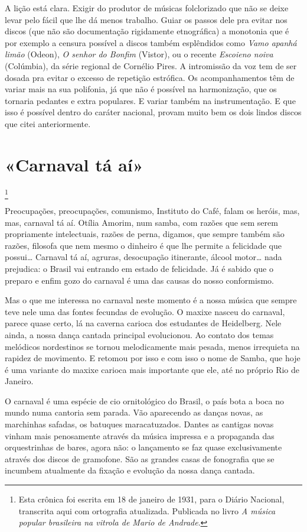 A lição está clara. Exigir do produtor de músicas folclorizado que não
se deixe levar pelo fácil que lhe dá menos trabalho. Guiar os passos
dele pra evitar nos discos (que não são documentação rigidamente
etnográfica) a monotonia que é por exemplo a censura possível a discos
também esplêndidos como \textit{Vamo apanhá limão} (Odeon), \textit{O senhor
do Bonfim} (Vistor), ou o recente \textit{Escoieno noiva} (Colúmbia), da
série regional de Cornélio Pires. A intromissão da voz tem de ser dosada
pra evitar o excesso de repetição estrófica. Os acompanhamentos têm de
variar mais na sua polifonia, já que não é possível na harmonização, que
os tornaria pedantes e extra populares. E variar também na
instrumentação. E que isso é possível dentro do caráter nacional, provam
muito bem os dois lindos discos que citei anteriormente.


\chapter{«Carnaval tá aí»}\footnote{Esta crônica foi escrita em 18 de janeiro de 1931, para o Diário Nacional, transcrita aqui com ortografia atualizada. Publicada no livro \textit{A música popular brasileira na vitrola de Mario de Andrade}.}

Preocupações, preocupações, comunismo, Instituto do Café, falam os
heróis, mas, mas, carnaval tá aí. Otília Amorim, num samba, com razões
que sem serem propriamente intelectuais, razões de perna, digamos, que
sempre também são razões, filosofa que nem mesmo o dinheiro é que lhe
permite a felicidade que possui\ldots{} Carnaval tá aí, agruras, desocupação
itinerante, álcool motor\ldots{} nada prejudica: o Brasil vai entrando em
estado de felicidade. Já é sabido que o preparo e enfim gozo do carnaval
é uma das causas do nosso conformismo.

Mas o que me interessa no carnaval neste momento é a nossa música que
sempre teve nele uma das fontes fecundas de evolução. O maxixe nasceu do
carnaval, parece quase certo, lá na caverna carioca dos estudantes de
Heidelberg. Nele ainda, a nossa dança cantada principal evolucionou. Ao
contato dos temas melódicos nordestinos se tornou melodicamente mais
pesada, menos irrequieta na rapidez de movimento. E retomou por isso e
com isso o nome de Samba, que hoje é uma variante do maxixe carioca mais
importante que ele, até no próprio Rio de Janeiro.

O carnaval é uma espécie de cio ornitológico do Brasil, o país bota a
boca no mundo numa cantoria sem parada. Vão aparecendo as danças novas,
as marchinhas safadas, os batuques maracatuzados. Dantes as cantigas
novas vinham mais penosamente através da música impressa e a propaganda
das orquestrinhas de bares, agora não: o lançamento se faz quase
exclusivamente através dos discos de gramofone. São as grandes casas de
fonografia que se incumbem atualmente da fixação e evolução da nossa
dança cantada.

